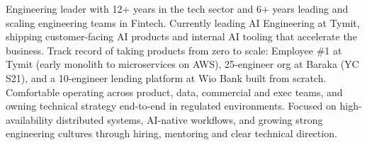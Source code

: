 

\begin{cvparagraph}

Engineering leader with 12+ years in the tech sector and 6+ years leading and scaling engineering teams in Fintech. Currently leading AI Engineering at Tymit, shipping customer-facing AI products and internal AI tooling that accelerate the business.\newline\newline
Track record of taking products from zero to scale: Employee \#1 at Tymit (early monolith to microservices on AWS), 25-engineer org at Baraka (YC S21), and a 10-engineer lending platform at Wio Bank built from scratch. Comfortable operating across product, data, commercial and exec teams, and owning technical strategy end-to-end in regulated environments.\newline\newline
Focused on high-availability distributed systems, AI-native workflows, and growing strong engineering cultures through hiring, mentoring and clear technical direction.
\end{cvparagraph}
